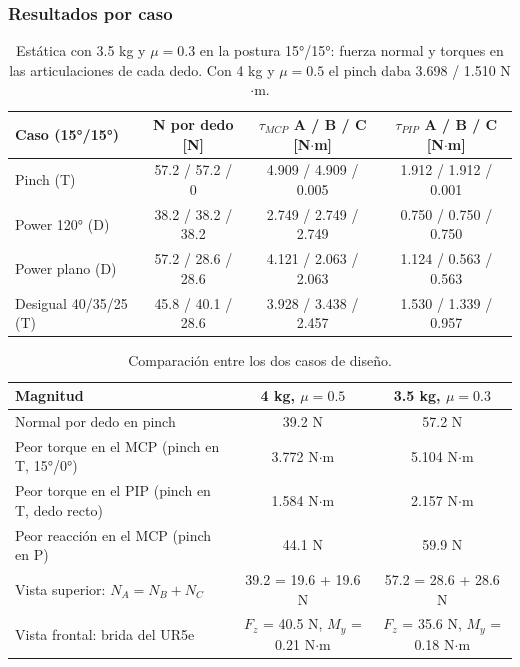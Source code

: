 \documentclass[11pt,letterpaper]{article}
\begin{document}
\subsubsection{Resultados por caso}
\begin{table}[H]
\centering
\small
\begin{tabular}{|l|c|c|c|}
\hline
\rowcolor{head}\textbf{Caso (15°/15°)} & \textbf{N por dedo [N]} & \textbf{$\tau_{MCP}$ A / B / C [N$\cdot$m]} & \textbf{$\tau_{PIP}$ A / B / C [N$\cdot$m]} \\ \hline
Pinch (T) & 57.2 / 57.2 / 0 & 4.909 / 4.909 / 0.005 & 1.912 / 1.912 / 0.001 \\ \hline
Power 120° (D) & 38.2 / 38.2 / 38.2 & 2.749 / 2.749 / 2.749 & 0.750 / 0.750 / 0.750 \\ \hline
Power plano (D) & 57.2 / 28.6 / 28.6 & 4.121 / 2.063 / 2.063 & 1.124 / 0.563 / 0.563 \\ \hline
Desigual 40/35/25 (T) & 45.8 / 40.1 / 28.6 & 3.928 / 3.438 / 2.457 & 1.530 / 1.339 / 0.957 \\ \hline
\end{tabular}
\caption{Estática con 3.5 kg y $\mu = 0.3$ en la postura 15°/15°: fuerza normal y torques en las articulaciones de cada dedo. Con 4 kg y $\mu = 0.5$ el pinch daba 3.698 / 1.510 N$\cdot$m.}
\label{tab:caso35}
\end{table}

\begin{table}[H]
\centering
\small
\begin{tabular}{|l|c|c|}
\hline
\rowcolor{head}\textbf{Magnitud} & \textbf{4 kg, $\mu = 0.5$} & \textbf{3.5 kg, $\mu = 0.3$} \\ \hline
Normal por dedo en pinch & 39.2 N & 57.2 N \\ \hline
Peor torque en el MCP (pinch en T, 15°/0°) & 3.772 N$\cdot$m & 5.104 N$\cdot$m \\ \hline
Peor torque en el PIP (pinch en T, dedo recto) & 1.584 N$\cdot$m & 2.157 N$\cdot$m \\ \hline
Peor reacción en el MCP (pinch en P) & 44.1 N & 59.9 N \\ \hline
Vista superior: $N_A = N_B + N_C$ & 39.2 = 19.6 + 19.6 N & 57.2 = 28.6 + 28.6 N \\ \hline
Vista frontal: brida del UR5e & $F_z$ = 40.5 N, $M_y$ = 0.21 N$\cdot$m & $F_z$ = 35.6 N, $M_y$ = 0.18 N$\cdot$m \\ \hline
\end{tabular}
\caption{Comparación entre los dos casos de diseño.}
\label{tab:comp35}
\end{table}
\end{document}
